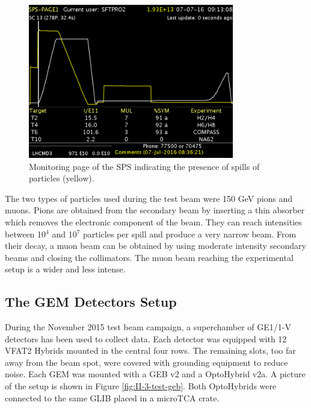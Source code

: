     \begin{figure}[h!]
      \centering
      \includegraphics[width=0.8\textwidth]{img/II-3-test-beam/sps.png}
      \caption{Monitoring page of the SPS indicating the presence of spills of particles (yellow).}
      \label{fig:II-3-sps}
    \end{figure}

    The two types of particles used during the test beam were 150 GeV pions and muons. Pions are obtained from the secondary beam by inserting a thin absorber which removes the electronic component of the beam. They can reach intensities between 10$^4$ and 10$^7$ particles per spill and produce a very narrow beam. From their decay, a muon beam can be obtained by using moderate intensity secondary beams and closing the collimators. The muon beam reaching the experimental setup is a wider and less intense.

    \subsection{The GEM Detectors Setup}

      During the November 2015 test beam campaign, a superchamber of GE1/1-V detectors has been used to collect data. Each detector was equipped with 12 VFAT2 Hybrids mounted in the central four rows. The remaining slots, too far away from the beam spot, were covered with grounding equipment to reduce noise. Each GEM was mounted with a GEB v2 and a OptoHybrid v2a. A picture of the setup is shown in Figure \ref{fig:II-3-test-geb}. Both OptoHybrids were connected to the same GLIB placed in a microTCA crate. \\

